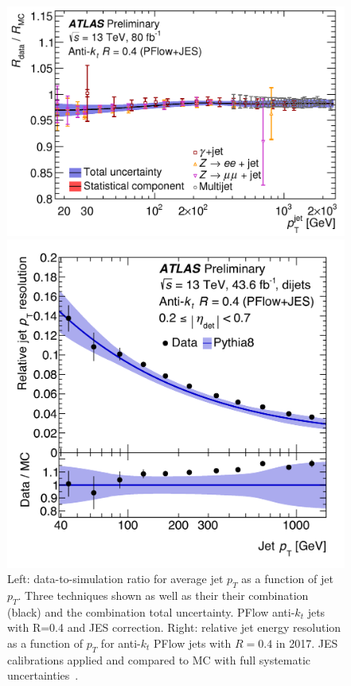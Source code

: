 \begin{figure}[!h]
    \centering
  \begin{minipage}[b]{0.5\textwidth}
  \includegraphics[width=\textwidth]{Pictures/ParticleFlowScale.png}
  \end{minipage}
  \hspace{.5cm}
  \begin{minipage}[b]{0.4\textwidth}
    \includegraphics[width=\textwidth]{Pictures/ParticleFlowResolution.png}
  \end{minipage}
    \caption{ Left: data-to-simulation ratio for average jet $p_T$ as a function of jet $p_T$. Three techniques shown as well as their their combination (black) and the combination total uncertainty. PFlow anti-$k_t$ jets with R=0.4 and JES correction. Right: relative jet energy resolution as a function of $p_T$ for anti-$k_t$ PFlow jets with $R=0.4$ in 2017. JES calibrations applied and compared to MC with full systematic uncertainties~\cite{JETEtmiss}.}
    \label{fig:ScaleRes}
\end{figure}

